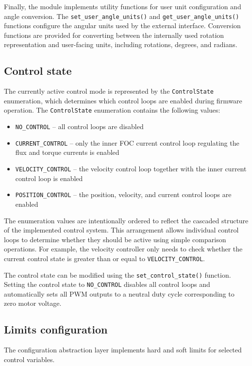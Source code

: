 Finally, the module implements utility functions for user unit configuration and angle conversion.
The \texttt{set\_user\_angle\_units()} and \texttt{get\_user\_angle\_units()} functions configure the angular units used by the external interface.
Conversion functions are provided for converting between the internally used rotation representation and user-facing units,
including rotations, degrees, and radians.

\subsection{Control state}
The currently active control mode is represented by the \texttt{ControlState} enumeration,
which determines which control loops are enabled during firmware operation.
The \texttt{ControlState} enumeration contains the following values:

\begin{itemize}
    \item \texttt{NO\_CONTROL} -- all control loops are disabled
    \item \texttt{CURRENT\_CONTROL} -- only the inner FOC current control loop regulating the flux and torque currents is enabled
    \item \texttt{VELOCITY\_CONTROL} -- the velocity control loop together with the inner current control loop is enabled
    \item \texttt{POSITION\_CONTROL} -- the position, velocity, and current control loops are enabled
\end{itemize}

The enumeration values are intentionally ordered to reflect the cascaded structure of the implemented control system.
This arrangement allows individual control loops to determine whether they should be active using simple comparison operations.
For example, the velocity controller only needs to check whether the current control state is greater than or equal to \texttt{VELOCITY\_CONTROL}.

The control state can be modified using the \texttt{set\_control\_state()} function.
Setting the control state to \texttt{NO\_CONTROL} disables all control loops
and automatically sets all PWM outputs to a neutral duty cycle corresponding to zero motor voltage.


\subsection{Limits configuration}
The configuration abstraction layer implements hard and soft limits for selected control variables.

